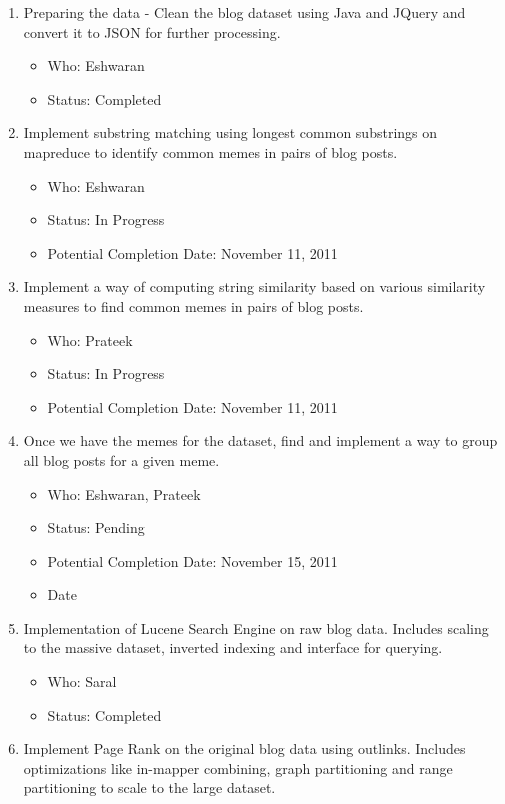 \documentclass{acm_proc_article-sp}
\begin{document}
\begin{enumerate}
  \item Preparing the data - Clean the blog dataset using Java and JQuery and convert it to JSON for further processing.	\begin{itemize}
	\item Who: Eshwaran
	\item Status: Completed
	\end{itemize}
  \item Implement substring matching using longest common substrings on mapreduce to identify common memes in pairs of blog posts. \begin{itemize}
	\item Who: Eshwaran
	\item Status: In Progress
	\item Potential Completion Date: November 11, 2011
	\end{itemize}
  \item Implement a way of computing string similarity based on various similarity measures to find common memes in pairs of blog posts.\begin{itemize}
	\item Who: Prateek
	\item Status: In Progress
	\item Potential Completion Date: November 11, 2011
	\end{itemize}
  \item Once we have the memes for the dataset, find and implement a way to group all blog posts for a given meme.\begin{itemize}
	\item Who: Eshwaran, Prateek
	\item Status: Pending
	\item Potential Completion Date: November 15, 2011
	\item Date
	\end{itemize}
  \item Implementation of Lucene Search Engine on raw blog data. Includes scaling to the massive dataset, inverted indexing and interface for querying.\begin{itemize}
	\item Who: Saral
	\item Status: Completed
	\end{itemize}
  \item Implement Page Rank on the original blog data using outlinks. Includes optimizations like in-mapper combining, graph partitioning and range partitioning to scale to the large dataset. \begin{itemize}

\end{itemize}
\end{enumerate}
\end{document}
